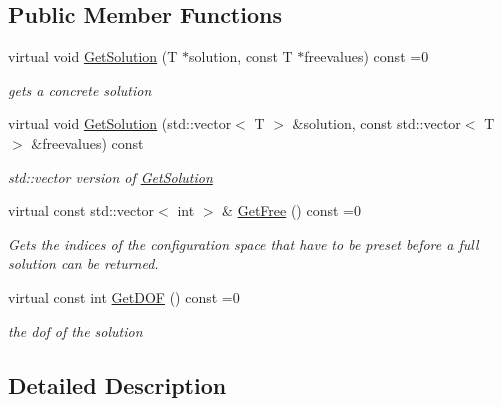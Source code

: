 \subsection*{Public Member Functions}
\begin{DoxyCompactItemize}
\item 
virtual void \hyperlink{classikfast_1_1IkSolutionBase_a9405530feb49f12f56c3175e7150c66f}{Get\-Solution} (T $\ast$solution, const T $\ast$freevalues) const =0
\begin{DoxyCompactList}\small\item\em gets a concrete solution \end{DoxyCompactList}\item 
\hypertarget{classikfast_1_1IkSolutionBase_a2b558f7a29be0868cff3e81fbd9594c4}{virtual void \hyperlink{classikfast_1_1IkSolutionBase_a2b558f7a29be0868cff3e81fbd9594c4}{Get\-Solution} (std\-::vector$<$ T $>$ \&solution, const std\-::vector$<$ T $>$ \&freevalues) const }\label{classikfast_1_1IkSolutionBase_a2b558f7a29be0868cff3e81fbd9594c4}

\begin{DoxyCompactList}\small\item\em std\-::vector version of \hyperlink{classikfast_1_1IkSolutionBase_a9405530feb49f12f56c3175e7150c66f}{Get\-Solution} \end{DoxyCompactList}\item 
virtual const std\-::vector$<$ int $>$ \& \hyperlink{classikfast_1_1IkSolutionBase_a2693ede66be937b7c4c1c949284282ca}{Get\-Free} () const =0
\begin{DoxyCompactList}\small\item\em Gets the indices of the configuration space that have to be preset before a full solution can be returned. \end{DoxyCompactList}\item 
\hypertarget{classikfast_1_1IkSolutionBase_aac54f54aa69b27991651b0ba2a21208c}{virtual const int \hyperlink{classikfast_1_1IkSolutionBase_aac54f54aa69b27991651b0ba2a21208c}{Get\-D\-O\-F} () const =0}\label{classikfast_1_1IkSolutionBase_aac54f54aa69b27991651b0ba2a21208c}

\begin{DoxyCompactList}\small\item\em the dof of the solution \end{DoxyCompactList}\end{DoxyCompactItemize}


\subsection{Detailed Description}
